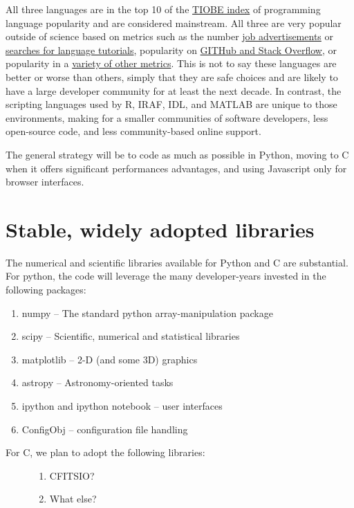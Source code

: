 \documentclass[letterpaper,10pt,english]{sphinxmanual}
\begin{document}
All three languages are in the top 10 of
the \href{http://www.tiobe.com/index.php/content/paperinfo/tpci/index.html}{TIOBE index} of programming
language popularity and are considered mainstream. All three are very popular
outside of science based on metrics such as the number \href{http://jobstractor.com/monthly-stats}{job advertisements}  or
\href{https://sites.google.com/site/pydatalog/pypl/PyPL-PopularitY-of-Programming-Language}{searches for language tutorials},
popularity on
\href{http://redmonk.com/sogrady/2013/02/28/language-rankings-1-13/}{GITHub and Stack Overflow},
or popularity in a
\href{http://langpop.com}{variety of other metrics}. This is not to say these languages
are better or worse than others, simply that they are safe choices and are likely
to have a large developer community for at least the next decade.  In contrast,
the scripting languages used by R, IRAF, IDL, and MATLAB are unique to those environments,
making for a smaller communities of software developers, less open-source code, and
less community-based online support.

The general strategy will be to code as much as possible in Python,
moving to C when it offers significant performances advantages, and using
Javascript only for browser interfaces.


\section{Stable, widely adopted libraries}
\label{intro:stable-widely-adopted-libraries}
The numerical and scientific libraries available for Python and C
are substantial. For python, the code will leverage the many developer-years
invested in the following packages:
\begin{enumerate}
\item {} 
numpy -- The standard python array-manipulation package

\item {} 
scipy -- Scientific, numerical and statistical libraries

\item {} 
matplotlib -- 2-D (and some 3D) graphics

\item {} 
astropy -- Astronomy-oriented tasks

\item {} 
ipython and ipython notebook -- user interfaces

\item {} 
ConfigObj -- configuration file handling

\end{enumerate}
\begin{description}
\item[{For C, we plan to adopt the following libraries:}] \leavevmode\begin{enumerate}
\item {} 
CFITSIO?

\item {} 
What else?

\end{enumerate}

\end{description}
\end{document}
